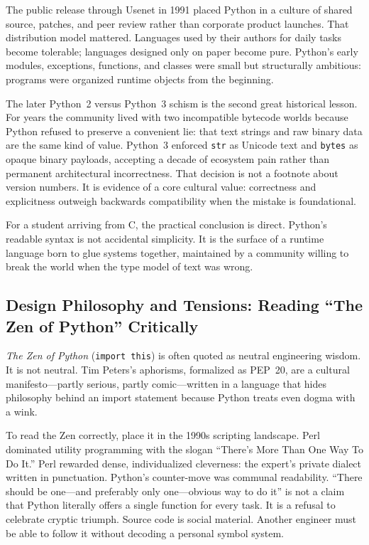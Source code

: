 \documentclass[a4paper,twoside]{report}
\begin{document}
The public release through Usenet in 1991 placed Python in a culture of shared source, patches, and peer review rather than corporate product launches. That distribution model mattered. Languages used by their authors for daily tasks become tolerable; languages designed only on paper become pure. Python's early modules, exceptions, functions, and classes were small but structurally ambitious: programs were organized runtime objects from the beginning.

The later Python~2 versus Python~3 schism is the second great historical lesson. For years the community lived with two incompatible bytecode worlds because Python refused to preserve a convenient lie: that text strings and raw binary data are the same kind of value. Python~3 enforced \texttt{str} as Unicode text and \texttt{bytes} as opaque binary payloads, accepting a decade of ecosystem pain rather than permanent architectural incorrectness. That decision is not a footnote about version numbers. It is evidence of a core cultural value: correctness and explicitness outweigh backwards compatibility when the mistake is foundational.

For a student arriving from C, the practical conclusion is direct. Python's readable syntax is not accidental simplicity. It is the surface of a runtime language born to glue systems together, maintained by a community willing to break the world when the type model of text was wrong.


\subsection{Design Philosophy and Tensions: Reading “The Zen of Python” Critically}

\emph{The Zen of Python} (\texttt{import this}) is often quoted as neutral engineering wisdom. It is not neutral. Tim Peters's aphorisms, formalized as PEP~20, are a cultural manifesto---partly serious, partly comic---written in a language that hides philosophy behind an import statement because Python treats even dogma with a wink.

To read the Zen correctly, place it in the 1990s scripting landscape. Perl dominated utility programming with the slogan ``There's More Than One Way To Do It.'' Perl rewarded dense, individualized cleverness: the expert's private dialect written in punctuation. Python's counter-move was communal readability. ``There should be one---and preferably only one---obvious way to do it'' is not a claim that Python literally offers a single function for every task. It is a refusal to celebrate cryptic triumph. Source code is social material. Another engineer must be able to follow it without decoding a personal symbol system.
\end{document}
